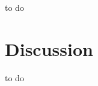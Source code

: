\documentclass[twocolumn,superscriptaddress,aps]{revtex4-1}
\begin{document}
    to do
    
    
    
    
    \section{Discussion}
    
    to do
    
    
    
    
    
    \nocite{*}
\end{document}
